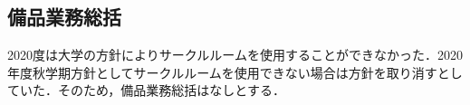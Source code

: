\subsection*{備品業務総括}

2020度は大学の方針によりサークルルームを使用することができなかった．2020年度秋学期方針としてサークルルームを使用できない場合は方針を取り消すとしていた．そのため，備品業務総括はなしとする．

